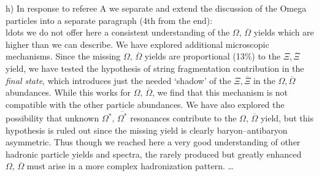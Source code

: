 \begin{mdframed}[linecolor=gray,roundcorner=12pt,backgroundcolor=Dandelion!15,linewidth=1pt,leftmargin=0cm,rightmargin=0cm,topline=true,bottomline=true,skipabove=12pt]





\noindent h) In response to referee A we separate and extend the discussion of the Omega particles into a separate paragraph (4th from the end):\\
ldots we do not offer here a consistent understanding of the $\Omega,\,\overline\Omega$ yields which are higher than we can describe. We have explored additional microscopic mechanisms. Since the missing $\Omega,\,\overline\Omega$ yields are proportional (13\%) to the $\Xi,\overline\Xi$ yield, we have tested the hypothesis of string fragmentation contribution in the {\it final state}, which introduces just the needed `shadow' of the $\Xi,\overline\Xi$ in the $\Omega,\overline\Omega$ abundances. While this works for $\Omega,\,\overline\Omega$, we find that this mechanism is not compatible with the other particle abundances. We have also explored the possibility that unknown $\Omega^*,\,\overline{\Omega^*}$ resonances contribute to the $\Omega,\,\overline\Omega$ yield, but this hypothesis is ruled out since the missing yield is clearly baryon--antibaryon asymmetric. Thus though we reached here a very good understanding of other hadronic particle yields and spectra, the rarely produced but greatly enhanced $\Omega,\,\overline\Omega$ must arise in a more complex hadronization pattern. \ldots \\


\end{mdframed}
